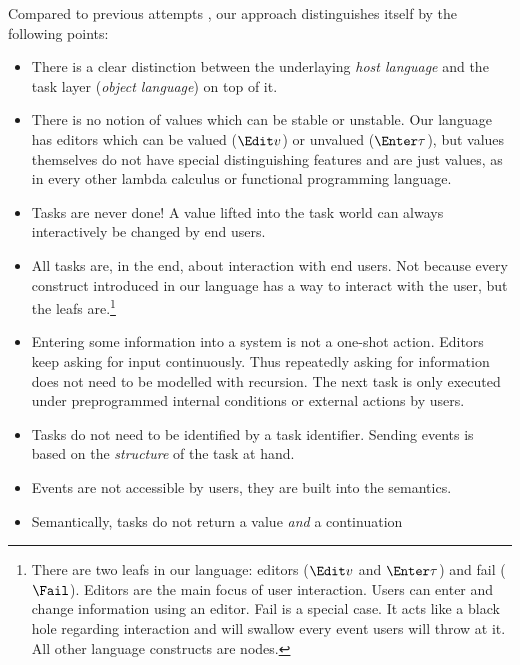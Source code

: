 Compared to previous attempts \cite{conf/ifl/KoopmanPA08,conf/ppdp/PlasmeijerLMAK12,theses/radboud/VinterHviid18},
our approach distinguishes itself by the following points:
\begin{itemize}
  \item
    There is a clear distinction between the underlaying \emph{host language}
    and the task layer (\emph{object language}) on top of it.
  \item
    There is no notion of values which can be stable or unstable.
    Our language has editors which can be valued ($\Edit v$) or unvalued ($\Enter \tau$),
    but values themselves do not have special distinguishing features and are just values,
    as in every other lambda calculus or functional programming language.
  \item
    Tasks are never done!
    A value lifted into the task world can always interactively be changed by end users.
  \item
    All tasks are, in the end, about interaction with end users.
    Not because every construct introduced in our language has a way to interact with the user,
    but the leafs are.\footnote{
      There are two leafs in our language: editors ($\Edit v$ and $\Enter \tau$) and fail ($\Fail$).
      Editors are the main focus of user interaction.
      Users can enter and change information using an editor.
      Fail is a special case.
      It acts like a black hole regarding interaction and will swallow every event users will throw at it.
      All other language constructs are nodes.
    }
  \item
    Entering some information into a system is not a one-shot action.
    Editors keep asking for input continuously.
    Thus repeatedly asking for information does not need to be modelled with recursion.
    The next task is only executed under preprogrammed internal conditions or external actions by users.
  \item
    Tasks do not need to be identified by a task identifier.
    Sending events is based on the \emph{structure} of the task at hand.
  \item
    Events are not accessible by users, they are built into the semantics.
  \item
    Semantically, tasks do not return a value \emph{and} a continuation

\end{itemize}
